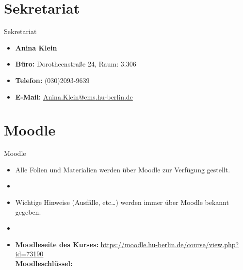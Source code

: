%
\section{Sekretariat}

\begin{frame}{Sekretariat}
	
\begin{itemize}
	\item[] \textbf{Anina Klein}	
	\item \textbf{Büro:} Dorotheenstraße 24, Raum: 3.306
	\item \textbf{Telefon:} (030)2093-9639
	\item \textbf{E-Mail:} \href{mailto:Anina.Klein@cms.hu-berlin.de}{Anina.Klein@cms.hu-berlin.de}
\end{itemize}	

\end{frame}



%
\section{Moodle}	

\begin{frame}{Moodle}

\begin{itemize}
	\item Alle Folien und Materialien werden über Moodle zur Verfügung gestellt.
	\item[]
	\item Wichtige Hinweise (Ausfälle, etc\dots) werden immer über Moodle bekannt gegeben.
	\item[]
	\item \textbf{Moodleseite des Kurses:} \url{https://moodle.hu-berlin.de/course/view.php?id=73190}\\
	\textbf{Moodleschlüssel:} %
\end{itemize}		

\end{frame}


